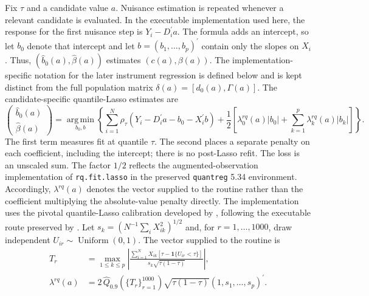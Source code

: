 Fix $\tau$ and a candidate value $a$. Nuisance estimation is repeated whenever a relevant candidate is evaluated. In the executable implementation used here, the response for the first nuisance step is $Y_i-D_i^{\prime}a$. The formula adds an intercept, so let $b_0$ denote that intercept and let $b=(b_1,\ldots,b_p)^{\prime}$ contain only the slopes on $X_i$. Thus, $(\widehat b_0(a),\widehat\beta(a))$ estimates $(c(a),\beta(a))$. The implementation-specific notation for the later instrument regression is defined below and is kept distinct from the full population matrix $\delta(a)=[d_0(a),\Gamma(a)]$. The candidate-specific quantile-Lasso estimates are
\begin{equation}
    \begin{pmatrix}
        \widehat b_0(a)\\
        \widehat\beta(a)
    \end{pmatrix}
    =
    \operatorname*{arg\,min}_{b_0,b}
    \left\{
        \sum_{i=1}^{N}
        \rho_{\tau}\!\left(
            Y_i-D_i^{\prime}a-b_0-X_i^{\prime}b
        \right)
        +
        \frac{1}{2}\left[
            \lambda_0^{rq}(a)|b_0|
            +\sum_{k=1}^{p}\lambda_k^{rq}(a)|b_k|
        \right]
    \right\}.
    \label{eq:beta-hat-dml}
\end{equation}
The first term measures fit at quantile $\tau$. The second places a separate penalty on each coefficient, including the intercept; there is no post-Lasso refit. The loss is an unscaled sum. The factor $1/2$ reflects the augmented-observation implementation of \texttt{rq.fit.lasso} in the preserved \texttt{quantreg} 5.34 environment. Accordingly, $\lambda^{rq}(a)$ denotes the vector supplied to the routine rather than the coefficient multiplying the absolute-value penalty directly. The implementation uses the pivotal quantile-Lasso calibration developed by \textcite{belloni_chernozhukov_2011}, following the executable route preserved by \textcite{chen_huang_tien_2021}. Let $s_k=(N^{-1}\sum_iX_{ik}^2)^{1/2}$ and, for $r=1,\ldots,1000$, draw independent $U_{ir}\sim\operatorname{Uniform}(0,1)$. The vector supplied to the routine is
\begin{equation}
    \begin{aligned}
        T_r
        &=
        \max_{1\leq k\leq p}
        \left|
            \frac{
                \sum_{i=1}^{N}X_{ik}
                \left[\tau-\mathbf{1}\{U_{ir}<\tau\}\right]
            }{
                s_k\sqrt{\tau(1-\tau)}
            }
        \right|,\\
        \lambda^{rq}(a)
        &=
        2\,\widehat Q_{0.9}\!\left(\{T_r\}_{r=1}^{1000}\right)
        \sqrt{\tau(1-\tau)}
        (1,s_1,\ldots,s_p)^{\prime}.
    \end{aligned}
    \label{eq:bc-pivotal-penalty}
\end{equation}
